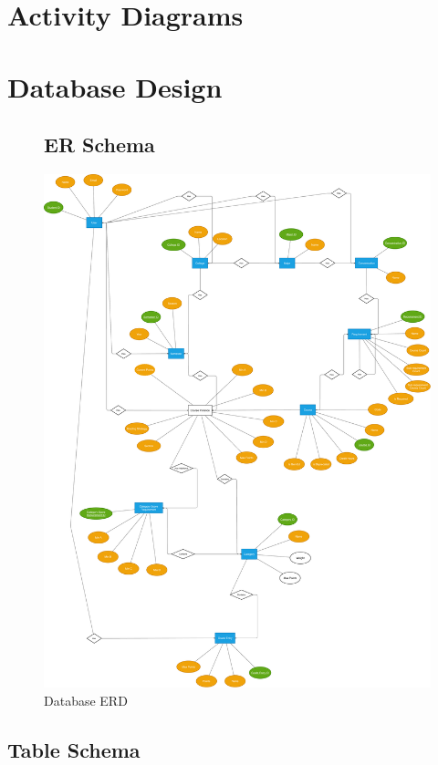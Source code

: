 \documentclass[12pt]{article}
\begin{document}
\section{Activity Diagrams}

\section{Database Design}

\begin{figure}[p!]
  \subsection{ER Schema}
  \centering
  \includegraphics[width=\linewidth]{database_erd.pdf}
  \caption{Database ERD}
\end{figure}

\clearpage

\subsection{Table Schema}
\end{document}

